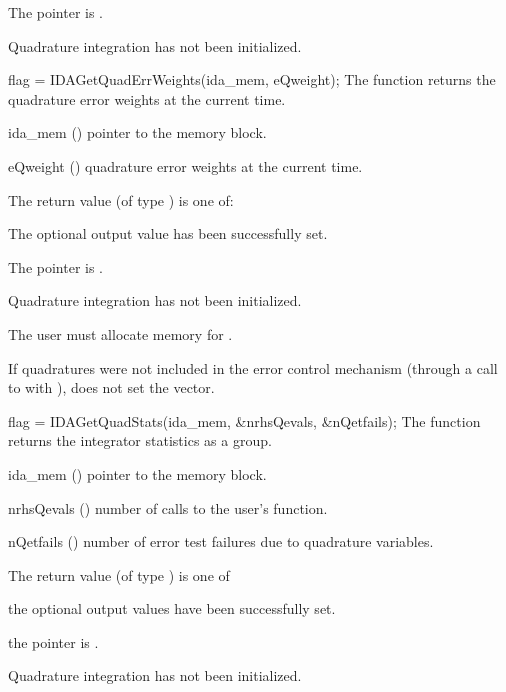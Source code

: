 {{\begin{args}
  \item[\Id{IDA\_MEM\_NULL}]
    The  pointer is .
  \item[\Id{IDA\_NO\_QUAD}]
    Quadrature integration has not been initialized.
  \end{args}
}
{}
{
  flag = IDAGetQuadErrWeights(ida\_mem, eQweight);
}
{
  The function  returns the quadrature error weights
  at the current time.
}
{
  \begin{args}
  \item[ida\_mem] ()
    pointer to the {\idas} memory block.
  \item[eQweight] ()
    quadrature error weights at the current time.
  \end{args}
}
{
  The return value  (of type ) is one of:
  \begin{args}
  \item[\Id{IDA\_SUCCESS}]
    The optional output value has been successfully set.
  \item[\Id{IDA\_MEM\_NULL}]
    The  pointer is .
  \item[\Id{IDA\_NO\_QUAD}]
    Quadrature integration has not been initialized.
  \end{args}
}
{
  {\warn}The user must allocate memory for .

  If quadratures were not included in the error control mechanism (through a
  call to  with ),
   does not set the  vector.
}
{
  flag = IDAGetQuadStats(ida\_mem, \&nrhsQevals, \&nQetfails);
}
{
  The function  returns the {\idas} integrator statistics
  as a group.
}
{
  \begin{args}
  \item[ida\_mem] ()
    pointer to the {\idas} memory block.
  \item[nrhsQevals] ()
    number of calls to the user's  function.
  \item[nQetfails] ()
    number of error test failures due to quadrature variables.
  \end{args}
}
{
  The return value  (of type ) is one of
  \begin{args}
  \item[\Id{IDA\_SUCCESS}]
    the optional output values have been successfully set.
  \item[\Id{IDA\_MEM\_NULL}]
    the  pointer is .
  \item[\Id{IDA\_NO\_QUAD}]
    Quadrature integration has not been initialized.
  \end{args}
}
{}

}
